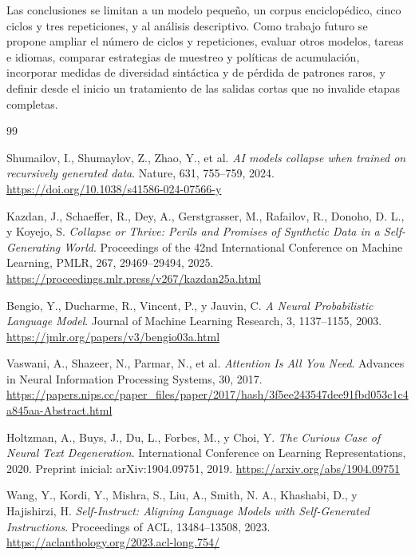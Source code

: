 \documentclass[12pt,letterpaper]{article}
\begin{document}
Las conclusiones se limitan a un modelo pequeño, un corpus enciclopédico,
cinco ciclos y tres repeticiones, y al análisis descriptivo. Como trabajo
futuro se propone ampliar el número de ciclos y repeticiones, evaluar
otros modelos, tareas e idiomas, comparar estrategias de muestreo y
políticas de acumulación, incorporar medidas de diversidad sintáctica y
de pérdida de patrones raros, y definir desde el inicio un tratamiento de
las salidas cortas que no invalide etapas completas.


\clearpage
{}
{}
\begin{thebibliography}{99}

Shumailov, I., Shumaylov, Z., Zhao, Y., et al.
\textit{AI models collapse when trained on recursively generated data}.
Nature, 631, 755--759, 2024.
\url{https://doi.org/10.1038/s41586-024-07566-y}

Kazdan, J., Schaeffer, R., Dey, A., Gerstgrasser, M., Rafailov, R.,
Donoho, D. L., y Koyejo, S.
\textit{Collapse or Thrive: Perils and Promises of Synthetic Data in a
Self-Generating World}.
Proceedings of the 42nd International Conference on Machine Learning,
PMLR, 267, 29469--29494, 2025.
\url{https://proceedings.mlr.press/v267/kazdan25a.html}

Bengio, Y., Ducharme, R., Vincent, P., y Jauvin, C.
\textit{A Neural Probabilistic Language Model}.
Journal of Machine Learning Research, 3, 1137--1155, 2003.
\url{https://jmlr.org/papers/v3/bengio03a.html}

Vaswani, A., Shazeer, N., Parmar, N., et al.
\textit{Attention Is All You Need}.
Advances in Neural Information Processing Systems, 30, 2017.
\url{https://papers.nips.cc/paper_files/paper/2017/hash/3f5ee243547dee91fbd053c1c4a845aa-Abstract.html}

Holtzman, A., Buys, J., Du, L., Forbes, M., y Choi, Y.
\textit{The Curious Case of Neural Text Degeneration}.
International Conference on Learning Representations, 2020.
Preprint inicial: arXiv:1904.09751, 2019.
\url{https://arxiv.org/abs/1904.09751}

Wang, Y., Kordi, Y., Mishra, S., Liu, A., Smith, N. A.,
Khashabi, D., y Hajishirzi, H.
\textit{Self-Instruct: Aligning Language Models with Self-Generated Instructions}.
Proceedings of ACL, 13484--13508, 2023.
\url{https://aclanthology.org/2023.acl-long.754/}


\end{thebibliography}
\end{document}
